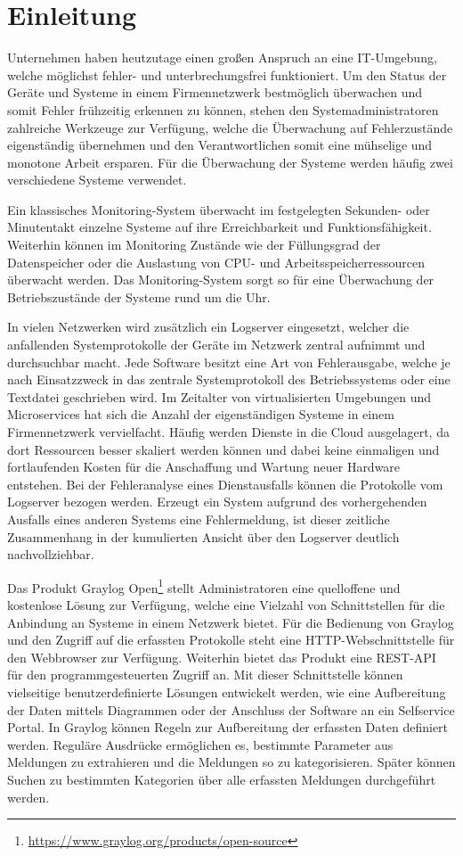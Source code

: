 \chapter{Einleitung}

Unternehmen haben heutzutage einen großen Anspruch an eine IT-Umgebung, welche möglichst fehler- und unterbrechungsfrei funktioniert. Um den Status der Geräte und Systeme in einem Firmennetzwerk bestmöglich überwachen und somit Fehler frühzeitig erkennen zu können, stehen den Systemadministratoren zahlreiche Werkzeuge zur Verfügung, welche die Überwachung auf Fehlerzustände eigenständig übernehmen und den Verantwortlichen somit eine mühselige und monotone Arbeit ersparen. Für die Überwachung der Systeme werden häufig zwei verschiedene Systeme verwendet. 

Ein klassisches Monitoring-System überwacht im festgelegten Sekunden- oder Minutentakt einzelne Systeme auf ihre Erreichbarkeit und Funktionsfähigkeit. Weiterhin können im Monitoring Zustände wie der Füllungsgrad der Datenspeicher oder die Auslastung von CPU- und Arbeitsspeicherressourcen überwacht werden. Das Monitoring-System sorgt so für eine Überwachung der Betriebszustände der Systeme rund um die Uhr. 

In vielen Netzwerken wird zusätzlich ein Logserver eingesetzt, welcher die anfallenden Systemprotokolle der Geräte im Netzwerk zentral aufnimmt und durchsuchbar macht. Jede Software besitzt eine Art von Fehlerausgabe, welche je nach Einsatzzweck in das zentrale Systemprotokoll des Betriebssystems oder eine Textdatei geschrieben wird. Im Zeitalter von virtualisierten Umgebungen und Microservices hat sich die Anzahl der eigenständigen Systeme in einem Firmennetzwerk vervielfacht. Häufig werden Dienste in die Cloud ausgelagert, da dort Ressourcen besser skaliert werden können und dabei keine einmaligen und fortlaufenden Kosten für die Anschaffung und Wartung neuer Hardware entstehen. Bei der Fehleranalyse eines Dienstausfalls können die Protokolle vom Logserver bezogen werden. Erzeugt ein System aufgrund des vorhergehenden Ausfalls eines anderen Systems eine Fehlermeldung, ist dieser zeitliche Zusammenhang in der kumulierten Ansicht über den Logserver deutlich nachvollziehbar.

Das Produkt Graylog Open\footnote{\url{https://www.graylog.org/products/open-source}} stellt Administratoren eine quelloffene und kostenlose Lösung zur Verfügung, welche eine Vielzahl von Schnittstellen für die Anbindung an Systeme in einem Netzwerk bietet. Für die Bedienung von Graylog und den Zugriff auf die erfassten Protokolle steht eine HTTP-Webschnittstelle für den Webbrowser zur Verfügung. Weiterhin bietet das Produkt eine REST-API für den programmgesteuerten Zugriff an. Mit dieser Schnittstelle können vielseitige benutzerdefinierte Lösungen entwickelt werden, wie eine Aufbereitung der Daten mittels Diagrammen oder der Anschluss der Software an ein Selfservice Portal. In Graylog können Regeln zur Aufbereitung der erfassten Daten definiert werden. Reguläre Ausdrücke ermöglichen es, bestimmte Parameter aus Meldungen zu extrahieren und die Meldungen so zu kategorisieren. Später können Suchen zu bestimmten Kategorien über alle erfassten Meldungen durchgeführt werden.

